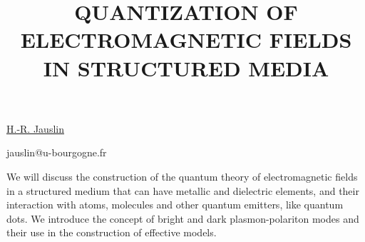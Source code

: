 \title{QUANTIZATION OF ELECTROMAGNETIC FIELDS IN STRUCTURED MEDIA}

\underline{H.-R. Jauslin}

{\normalsize{\vspace{-4mm}
\dijon


\email jauslin@u-bourgogne.fr}}

We will discuss the construction of the quantum theory of electromagnetic fields in
a structured medium that can have metallic and dielectric elements, and their interaction
with atoms, molecules and other quantum emitters, like quantum dots. We introduce the
concept of bright and dark plasmon-polariton modes and their use in the
construction of effective models.

\vspace{\baselineskip}
